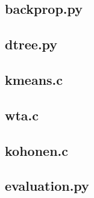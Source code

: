 \documentclass{article}
\begin{document}
\subsection*{backprop.py}

\newpage
\subsection*{dtree.py}

\newpage
\subsection*{kmeans.c}

\newpage
\subsection*{wta.c}

\newpage
\subsection*{kohonen.c}

\newpage
\subsection*{evaluation.py}

\newpage
\end{document}
